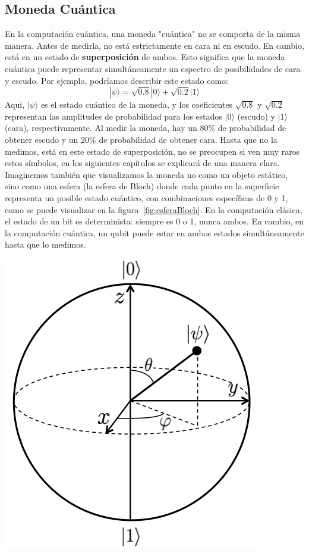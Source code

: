 \subsection*{Moneda Cuántica}
\noindent
En la computación cuántica, una moneda "cuántica" no se comporta de la misma manera. Antes de medirla, no está estrictamente en cara ni en escudo. En cambio, está en un estado de \textbf{superposición} de ambos. Esto significa que la moneda cuántica puede representar simultáneamente un espectro de posibilidades de cara y escudo. Por ejemplo, podríamos describir este estado como:\\
\[
|\psi\rangle = \sqrt{0.8}|0\rangle + \sqrt{0.2}|1\rangle
\]
\noindent
Aquí, \( |\psi\rangle \) es el estado cuántico de la moneda, y los coeficientes \( \sqrt{0.8} \) y \( \sqrt{0.2} \) representan las amplitudes de probabilidad para los estados \( |0\rangle \) (escudo) y \( |1\rangle \) (cara), respectivamente. Al medir la moneda, hay un 80\% de probabilidad de obtener escudo y un 20\% de probabilidad de obtener cara.
Hasta que no la medimos, está en este estado de superposición, no se preocupen si ven muy raros estos símbolos, en los siguientes capítulos se explicará de una manera clara.\\[0.5em]
\noindent
Imaginemos también que visualizamos la moneda no como un objeto estático, sino como una esfera (la esfera de Bloch) donde cada punto en la superficie representa un posible estado cuántico, con combinaciones específicas de 0 y 1, como se puede visualizar en la figura~\ref{fig:esferaBloch}. En la computación clásica, el estado de un bit es determinista: siempre es 0 o 1, nunca ambos. En cambio, en la computación cuántica, un qubit puede estar en ambos estados simultáneamente hasta que lo medimos.\\
\noindent
\begin{center}
\includegraphics[scale=0.30]{img/EsferadeBloch.png}
\label{fig:esferaBloch}
\end{center}
